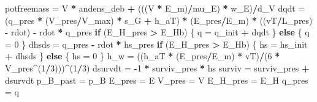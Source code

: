 \documentclass[]{article}
\newenvironment{Shaded}{\begin{snugshade}}{\end{snugshade}}
\newcommand{\DecValTok}[1]{\textcolor[rgb]{0.00,0.00,0.81}{#1}}
\newcommand{\StringTok}[1]{\textcolor[rgb]{0.31,0.60,0.02}{#1}}
\newcommand{\ControlFlowTok}[1]{\textcolor[rgb]{0.13,0.29,0.53}{\textbf{#1}}}
\newcommand{\OperatorTok}[1]{\textcolor[rgb]{0.81,0.36,0.00}{\textbf{#1}}}
\newcommand{\NormalTok}[1]{#1}
\begin{document}
\begin{Shaded}
\begin{Highlighting}[]
{{{\NormalTok{    potfreemass =}\StringTok{ }\NormalTok{V }\OperatorTok{*}\StringTok{ }\NormalTok{andens_deb }\OperatorTok{+}\StringTok{ }\NormalTok{(((V }\OperatorTok{*}\StringTok{ }\NormalTok{E_m)}\OperatorTok{/}\NormalTok{mu_E) }\OperatorTok{*}\StringTok{ }\NormalTok{w_E)}\OperatorTok{/}\NormalTok{d_V}
\NormalTok{    dqdt =}\StringTok{ }\NormalTok{(q_pres }\OperatorTok{*}\StringTok{ }\NormalTok{(V_pres}\OperatorTok{/}\NormalTok{V_max) }\OperatorTok{*}\StringTok{ }\NormalTok{s_G }\OperatorTok{+}\StringTok{ }\NormalTok{h_aT) }\OperatorTok{*}\StringTok{ }\NormalTok{(E_pres}\OperatorTok{/}\NormalTok{E_m) }\OperatorTok{*}\StringTok{ }
\StringTok{        }\NormalTok{((vT}\OperatorTok{/}\NormalTok{L_pres) }\OperatorTok{-}\StringTok{ }\NormalTok{rdot) }\OperatorTok{-}\StringTok{ }\NormalTok{rdot }\OperatorTok{*}\StringTok{ }\NormalTok{q_pres}
    \ControlFlowTok{if}\NormalTok{ (E_H_pres }\OperatorTok{>}\StringTok{ }\NormalTok{E_Hb) \{}
\NormalTok{        q =}\StringTok{ }\NormalTok{q_init }\OperatorTok{+}\StringTok{ }\NormalTok{dqdt}
\NormalTok{    \}}
    \ControlFlowTok{else}\NormalTok{ \{}
\NormalTok{        q =}\StringTok{ }\DecValTok{0}
\NormalTok{    \}}
\NormalTok{    dhsds =}\StringTok{ }\NormalTok{q_pres }\OperatorTok{-}\StringTok{ }\NormalTok{rdot }\OperatorTok{*}\StringTok{ }\NormalTok{hs_pres}
    \ControlFlowTok{if}\NormalTok{ (E_H_pres }\OperatorTok{>}\StringTok{ }\NormalTok{E_Hb) \{}
\NormalTok{        hs =}\StringTok{ }\NormalTok{hs_init }\OperatorTok{+}\StringTok{ }\NormalTok{dhsds}
\NormalTok{    \}}
    \ControlFlowTok{else}\NormalTok{ \{}
\NormalTok{        hs =}\StringTok{ }\DecValTok{0}
\NormalTok{    \}}
\NormalTok{    h_w =}\StringTok{ }\NormalTok{((h_aT }\OperatorTok{*}\StringTok{ }\NormalTok{(E_pres}\OperatorTok{/}\NormalTok{E_m) }\OperatorTok{*}\StringTok{ }\NormalTok{vT)}\OperatorTok{/}\NormalTok{(}\DecValTok{6} \OperatorTok{*}\StringTok{ }\NormalTok{V_pres}\OperatorTok{^}\NormalTok{(}\DecValTok{1}\OperatorTok{/}\DecValTok{3}\NormalTok{)))}\OperatorTok{^}\NormalTok{(}\DecValTok{1}\OperatorTok{/}\DecValTok{3}\NormalTok{)}
\NormalTok{    dsurvdt =}\StringTok{ }\OperatorTok{-}\DecValTok{1} \OperatorTok{*}\StringTok{ }\NormalTok{surviv_pres }\OperatorTok{*}\StringTok{ }\NormalTok{hs}
\NormalTok{    surviv =}\StringTok{ }\NormalTok{surviv_pres }\OperatorTok{+}\StringTok{ }\NormalTok{dsurvdt}
\NormalTok{    p_B_past =}\StringTok{ }\NormalTok{p_B}
\NormalTok{    E_pres =}\StringTok{ }\NormalTok{E}
\NormalTok{    V_pres =}\StringTok{ }\NormalTok{V}
\NormalTok{    E_H_pres =}\StringTok{ }\NormalTok{E_H}
\NormalTok{    q_pres =}\StringTok{ }\NormalTok{q}
}}}
\end{Highlighting}
\end{Shaded}
\end{document}
